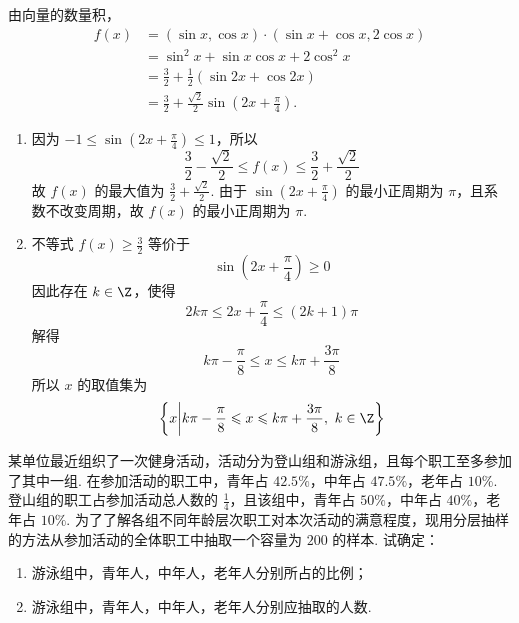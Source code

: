 \begin{solution}
由向量的数量积，
\[
\begin{aligned}
f(x)
&=(\sin x,\cos x)\cdot(\sin x+\cos x,2\cos x)\\
&=\sin^2x+\sin x\cos x+2\cos^2x\\
&=\frac32+\frac12(\sin 2x+\cos 2x)\\
&=\frac32+\frac{\sqrt2}{2}\sin\left(2x+\frac\pi4\right).
\end{aligned}
\]

\begin{enumerate}
\item 因为 \(-1\leqslant\sin(2x+\frac\pi4)\leqslant1\)，所以
\[
\frac32-\frac{\sqrt2}{2}\leqslant f(x)\leqslant\frac32+\frac{\sqrt2}{2}
\]
故 \(f(x)\) 的最大值为 \(\frac32+\frac{\sqrt2}{2}\). 由于 \(\sin(2x+\frac\pi4)\) 的最小正周期为 \(\pi\)，且系数不改变周期，故 \(f(x)\) 的最小正周期为 \(\pi\).

\item 不等式 \(f(x)\geqslant\frac32\) 等价于
\[
\sin\left(2x+\frac\pi4\right)\geqslant0
\]
因此存在 \(k\in\Z\)，使得
\[
2k\pi\leqslant2x+\frac\pi4\leqslant(2k+1)\pi
\]
解得
\[
k\pi-\frac\pi8\leqslant x\leqslant k\pi+\frac{3\pi}{8}
\]
所以 \(x\) 的取值集为
\[
\left\{x\middle|k\pi-\frac\pi8\leqslant x\leqslant k\pi+\frac{3\pi}{8},\ k\in\Z\right\}
\]
\end{enumerate}
\end{solution}

\begin{problem}
某单位最近组织了一次健身活动，活动分为登山组和游泳组，且每个职工至多参加了其中一组. 在参加活动的职工中，青年占 \(42.5\%\)，中年占 \(47.5\%\)，老年占 \(10\%\). 登山组的职工占参加活动总人数的 \(\frac{1}{4}\)，且该组中，青年占 \(50\%\)，中年占 \(40\%\)，老年占 \(10\%\). 为了了解各组不同年龄层次职工对本次活动的满意程度，现用分层抽样的方法从参加活动的全体职工中抽取一个容量为 \(200\) 的样本. 试确定：

\begin{enumerate}
\item 游泳组中，青年人，中年人，老年人分别所占的比例；
\item 游泳组中，青年人，中年人，老年人分别应抽取的人数.
\end{enumerate}
\end{problem}

